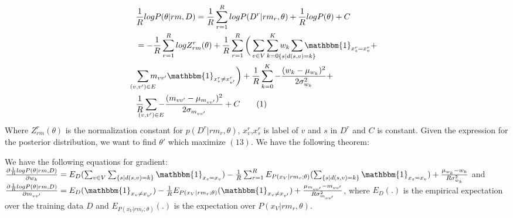 \documentclass[conference]{IEEEtran}
\newcommand\numberthis{\addtocounter{equation}{1}\tag{\theequation}}
\begin{document}
\begin{align*}
    &\frac{1}{R}log P(\theta|rm,D) = \frac{1}{R}\sum_{r=1}^{R}log P(D^{r}|rm_{r},\theta) + \frac{1}{R}log  P(\theta)+ C\\&= -\frac{1}{R}\sum_{r=1}^{R}logZ_{rm}^{r}(\theta) + \frac{1}{R}\sum_{r=1}^{R}\bigg(\sum_{v\in V}\sum_{k=0}^{K}w_{k}\smashoperator{\sum_{\{s|d(s,v)=k\}}} \mathbbm{1}_{x^{r}_{s}=x^{r}_{v}} + \\& \smashoperator{\sum_{(v,v')\in E}} m_{vv'} \mathbbm{1}_{x^{r}_{v}\neq x^{r}_{v'}} \bigg)+ \frac{1}{R} \sum_{k=0}^{K} -\frac{(w_{k}-\mu_{w_{k}})^{2}}{2\sigma_{w_{k}}^{2}} + \\& \frac{1}{R} \smashoperator{\sum_{(v,v')\in E}} -\frac{(m_{vv'}-\mu_{m_{vv'}})^{2}}{2\sigma_{m_{vv'}}} + C \numberthis 
\end{align*}
Where $Z_{rm}^{r}(\theta)$ is the normalization constant for $p(D^{r}|rm_{r},\theta)$, $x^{r}_{v}$,$x^{r}_{s}$ is label of $v$ and $s$ in $D^{r}$ and $C$ is constant. Given the expression for the posterior distribution, we want to find $\theta'$ which maximize $(13)$. We have the following theorem:
\begin{mydef1}
	We have the following equations for gradient: \\
 $\frac{\partial \frac{1}{R}log P(\theta|rm,D)}{\partial w_{k}}= E_{D}(\sum_{v\in V} \sum_{\{s|d(s,v)=k\}} \mathbbm{1}_{x_{s}=x_{v}})-\frac{1}{R} \sum_{r=1}^{R}E_{P(x_{V}|rm_{r};\theta)}(\sum_{\{s|d(s,v)=k\}} \mathbbm{1}_{x_{s}=x_{v}}) + \frac{\mu_{w_{k}}-{w}_{k}}{R\sigma_{w_{k}}^{2}}$ and  $\frac{\partial \frac{1}{R}log P(\theta|rm,D)}{\partial m_{vv'}}= E_{D}(\mathbbm{1}_{x_{v}\neq x_{v'}}) -\frac{1}{R} E_{P(x_{V}|rm_{r};\theta)} (\mathbbm{1}_{x_{v}\neq x_{v'}})+\frac{\mu_{m_{vv'}}-m_{vv'}}{R\sigma_{m_{vv'}}^{2}}$, where $E_{D}(.)$ is the empirical expectation over the training data $D$ and $E_{P(x_{V}|rm_{r};\theta)}(.)$ is the expectation over $P(x_{V}|rm_{r},\theta)$. 
\end{mydef1}
\end{document}
